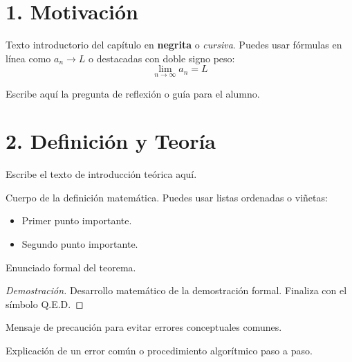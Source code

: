 \documentclass[11pt]{article}
\newenvironment{motivacion}{%
  \section*{1. Motivación}%
}{}
\newenvironment{preguntaguia}{%
  \begin{tcolorbox}[colback=cyan!5,colframe=cyan!75!black,title=Pregunta Guía]%
}{%
  \end{tcolorbox}%
}
\newenvironment{teoria}{%
  \section*{2. Definición y Teoría}%
}{}
\newenvironment{definicion}[1]{%
  \begin{tcolorbox}[colback=blue!5,colframe=blue!75!black,title=Definición: #1]%
}{%
  \end{tcolorbox}%
}
\newenvironment{teorema}[1]{%
  \begin{tcolorbox}[colback=green!5,colframe=green!75!black,title=Teorema: #1]%
}{%
  \end{tcolorbox}%
}
\newenvironment{alerta}[1]{%
  \begin{tcolorbox}[colback=yellow!5,colframe=yellow!75!black,title=Alerta: #1]%
}{%
  \end{tcolorbox}%
}
\newenvironment{procesamiento}[1]{%
  \begin{tcolorbox}[colback=gray!10,colframe=gray!75!black,title=Procedimiento: #1]%
}{%
  \end{tcolorbox}%
}
\begin{document}
\begin{motivacion}
  Texto introductorio del capítulo en \textbf{negrita} o \textit{cursiva}.
  Puedes usar fórmulas en línea como $a_n \to L$ o destacadas con doble signo peso:
  $$ \lim_{n \to \infty} a_n = L $$

  \begin{preguntaguia}
    Escribe aquí la pregunta de reflexión o guía para el alumno.
  \end{preguntaguia}
\end{motivacion}


\begin{teoria}
  Escribe el texto de introducción teórica aquí.
  
  \begin{definicion}{Título de la Definición}
    Cuerpo de la definición matemática. Puedes usar listas ordenadas o viñetas:
    \begin{itemize}
      \item Primer punto importante.
      \item Segundo punto importante.
    \end{itemize}
  \end{definicion}

  \begin{teorema}{Título del Teorema}
    Enunciado formal del teorema.
  \end{teorema}
  
  \begin{proof}[Demostración]
    Desarrollo matemático de la demostración formal. Finaliza con el símbolo Q.E.D.
  \end{proof}

  \begin{alerta}{Nota de Advertencia}
    Mensaje de precaución para evitar errores conceptuales comunes.
  \end{alerta}

  \begin{procesamiento}{Trampa Cognitiva}
    Explicación de un error común o procedimiento algorítmico paso a paso.
  \end{procesamiento}
\end{teoria}
\end{document}
